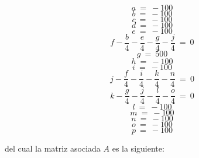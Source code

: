 \begin{equation}
 a\ =\ -100
\end{equation}
\begin{equation}
 b\ =\ -100
\end{equation}
\begin{equation}
 c\ =\ -100
\end{equation}
\begin{equation}
 d\ =\ -100
\end{equation}
\begin{equation}
 e\ =\ -100
\end{equation}
\begin{equation}
 f - \frac{b}{4} - \frac{e}{4} - \frac{g}{4} - \frac{j}{4}\ =\ 0
\end{equation}
\begin{equation}
 g\ =\ 500
\end{equation}
\begin{equation}
 h\ =\ -100
\end{equation}
\begin{equation}
 i\ =\ -100
\end{equation}
\begin{equation}
 j- \frac{f}{4} - \frac{i}{4} - \frac{k}{4} - \frac{n}{4}\ =\ 0
\end{equation}
\begin{equation}
 k- \frac{g}{4} - \frac{j}{4} - \frac{l}{4} - \frac{o}{4}\ =\ 0
\end{equation}
\begin{equation}
 l\ =\ -100
\end{equation}
\begin{equation}
 m\ =\ -100
\end{equation}
\begin{equation}
 n\ =\ -100
\end{equation}
\begin{equation}
 o\ =\ -100
\end{equation}
\begin{equation}
 p\ =\ -100
\end{equation}

del cual la matriz asociada $A$ es la siguiente:
 

